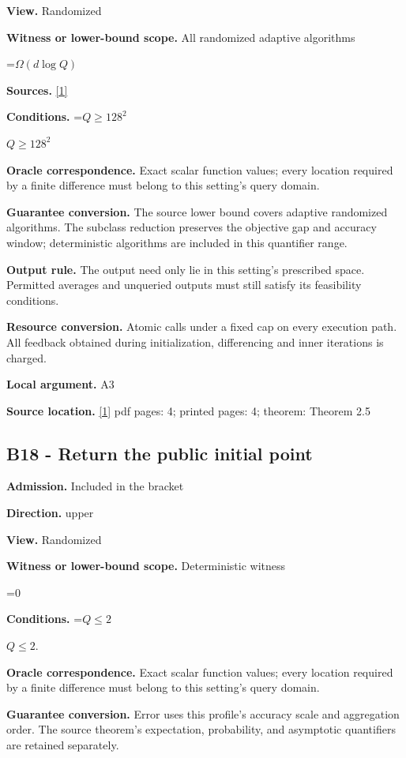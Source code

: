 \documentclass[10pt,a4paper]{article}
\newcommand{\AtlasMath}[1]{\par\begingroup\centering\setbox0=\hbox{$\displaystyle #1$}\ifdim\wd0>1.4\linewidth\typeout{ATLAS WIDE FORMULA: \the\wd0}\fi\ifdim\wd0>\linewidth\resizebox{\linewidth}{!}{\box0}\else\box0\fi\par\endgroup}
\newcommand{\AtlasInlineMath}[1]{\begingroup\setbox0=\hbox{$#1$}\ifdim\wd0>.4\linewidth\endgroup\AtlasMath{#1}\else\endgroup$#1$\fi}
\begin{document}
\textbf{View.} Randomized

\textbf{Witness or lower-bound scope.} All randomized adaptive algorithms

\AtlasMath{\Omega(d\log Q)}
\textbf{Sources.} \href{https://arxiv.org/html/2610.00345v1}{[1]}

\textbf{Conditions.} \AtlasInlineMath{Q\ge128^2}

\textbf{Oracle correspondence.} Exact scalar function values; every location required by a finite difference must belong to this setting's query domain.

\textbf{Guarantee conversion.} The source lower bound covers adaptive randomized algorithms. The subclass reduction preserves the objective gap and accuracy window; deterministic algorithms are included in this quantifier range.

\textbf{Output rule.} The output need only lie in this setting's prescribed space. Permitted averages and unqueried outputs must still satisfy its feasibility conditions.

\textbf{Resource conversion.} Atomic calls under a fixed cap on every execution path. All feedback obtained during initialization, differencing and inner iterations is charged.

\textbf{Local argument.} A3

\textbf{Source location.} \href{https://arxiv.org/html/2610.00345v1}{[1]} pdf pages: 4; printed pages: 4; theorem: Theorem 2.5

\subsection{B18 - Return the public initial point}
\textbf{Admission.} Included in the bracket

\textbf{Direction.} upper

\textbf{View.} Randomized

\textbf{Witness or lower-bound scope.} Deterministic witness

\AtlasMath{0}
\textbf{Conditions.} \AtlasInlineMath{Q\le2}.

\textbf{Oracle correspondence.} Exact scalar function values; every location required by a finite difference must belong to this setting's query domain.

\textbf{Guarantee conversion.} Error uses this profile's accuracy scale and aggregation order. The source theorem's expectation, probability, and asymptotic quantifiers are retained separately.
\end{document}
